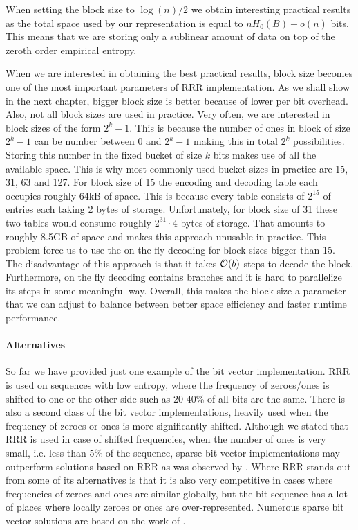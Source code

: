 When setting the block size to $\log(n)/2$ we obtain interesting practical results as
the total space used by our representation is equal to $nH_0(B) + o(n)$ bits. This means
that we are storing only a sublinear amount of data on top of the zeroth order empirical entropy.

When we are interested in obtaining the best practical results, block size becomes
one of the most important parameters of RRR implementation. As we shall show in the next
chapter, bigger block size is better because of lower per bit overhead. Also, not all block
sizes are used in practice. Very often, we are interested in block sizes of the form $2^k-1$.
This is because the number of ones in block of size $2^k-1$ can be number between 0 and $2^k-1$
making this in total $2^k$ possibilities. Storing this number in the fixed bucket of size
$k$ bits makes use of all the available space. This is why most commonly used bucket sizes in
practice are 15, 31, 63 and 127. For block size of 15 the encoding and decoding table
each occupies roughly 64kB of space. This is because every table consists of $2^{15}$ of entries
each taking 2 bytes of storage. Unfortunately, for block size of 31 these two tables would consume
roughly $2^{31}\cdot 4$ bytes of storage. That amounts to roughly 8.5GB of space and makes this approach
unusable in practice. This problem force us to use the on the fly decoding for block sizes
bigger than 15. The disadvantage of this approach is that it takes $\mathcal{O}(b)$ steps to decode the block.
Furthermore, on the fly decoding contains branches and it is hard to parallelize its steps in some meaningful
way. Overall, this makes the block size a parameter that we can adjust to balance between better space
efficiency and faster runtime performance.

\paragraph{Alternatives}

So far we have provided just one example of the bit vector implementation.
RRR is used on sequences with low entropy, where the frequency of zeroes/ones
is shifted to one or the other side such as 20-40\% of all bits are the same.
There is also a second class of the bit vector implementations, heavily
used when the frequency of zeroes or ones is more significantly shifted.
Although we stated that RRR is used in case of shifted frequencies, when the number
of ones is very small, i.e. less than 5\% of the sequence, sparse bit vector
implementations may outperform solutions based on RRR as was observed by \cite{navarro2012fast}.
Where RRR stands out from some of its alternatives is that it is also very competitive
in cases where frequencies of zeroes and ones are similar globally, but the bit
sequence has a lot of places where locally zeroes or ones are over-represented.
Numerous sparse bit vector solutions are based on the work of \cite{okanohara2007practical}.